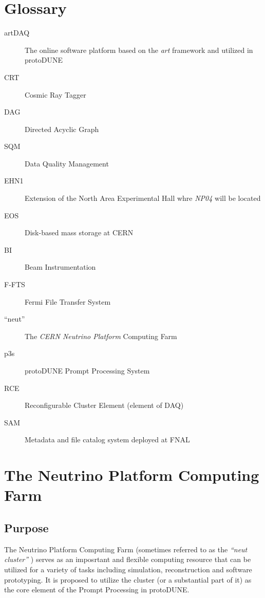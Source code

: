 \documentclass[pdftex,12pt,letter]{article}
\newcommand{\pd}{protoDUNE\xspace}
\newcommand{\expname}{\textit{NP04}\xspace}
\begin{document}
\newpage
\appendix
\section{Glossary}
\label{sec:glossary}
\begin{description}

\item [artDAQ] The online software platform based on the \textit{art} framework and utilized in \pd

\item [CRT] Cosmic Ray Tagger

\item [DAG] Directed Acyclic Graph

\item [SQM] Data Quality Management

\item [EHN1] Extension of the North Area Experimental Hall whre \expname will be located

\item [EOS] Disk-based mass storage at CERN

\item [BI] Beam Instrumentation

\item [F-FTS] Fermi File Transfer System

\item [``neut''] The \textit{CERN Neutrino Platform} Computing Farm

\item [p3s] \pd Prompt Processing System

\item [RCE] Reconfigurable Cluster Element (element of DAQ)

\item [SAM] Metadata and file catalog system deployed at FNAL
\end{description}

\section{The Neutrino Platform Computing Farm}
\label{appendix:neut}
\subsection{Purpose}
The Neutrino Platform Computing Farm (sometimes referred to as the \textit{``neut cluster''} \cite{neut})
serves as an imposrtant and flexible computing resource that can be utilized for a variety of tasks including
simulation, reconstruction and software prototyping. It is proposed to utilize the cluster (or a substantial part of it) as the
core element of the Prompt Processing in \pd.
\end{document}
